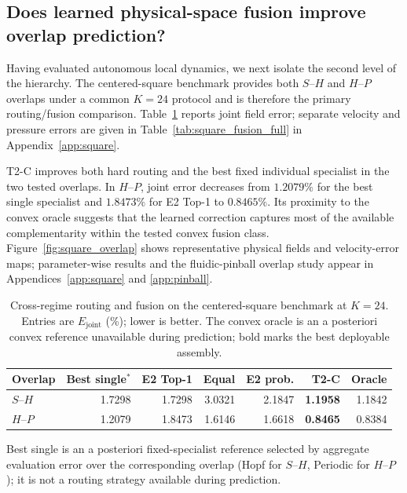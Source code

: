 \subsection{Does learned physical-space fusion improve overlap prediction?}

Having evaluated autonomous local dynamics, we next isolate the second level
of the hierarchy. The centered-square benchmark provides both $S$--$H$ and
$H$--$P$ overlaps under a common $K=24$ protocol and is therefore the primary
routing/fusion comparison. Table~\ref{tab:routing_fusion} reports joint field
error; separate velocity and pressure errors are given in
Table~\ref{tab:square_fusion_full} in Appendix~\ref{app:square}.

T2-C improves both hard routing and the best fixed individual specialist in
the two tested overlaps. In $H$--$P$, joint error decreases from $1.2079\%$
for the best single specialist and $1.8473\%$ for E2 Top-1 to $0.8465\%$.
Its proximity to the convex oracle suggests that the learned correction
captures most of the available complementarity within the tested convex
fusion class. Figure~\ref{fig:square_overlap} shows representative physical
fields and velocity-error maps; parameter-wise results and the fluidic-pinball
overlap study appear in Appendices~\ref{app:square} and \ref{app:pinball}.

\begin{table}[t]
\centering
\caption{Cross-regime routing and fusion on the centered-square benchmark at
$K=24$. Entries are $E_{\mathrm{joint}}$ (\%); lower is better.
The convex oracle is an a posteriori convex reference unavailable during prediction;
bold marks the best deployable assembly.}
\label{tab:routing_fusion}
\small
\setlength{\tabcolsep}{5pt}
\begin{threeparttable}
\begin{tabular}{@{}lrrrrrr@{}}
\toprule
Overlap & Best single$^\ast$ & E2 Top-1 & Equal & E2 prob. & T2-C & Oracle \\
\midrule
$S$--$H$ & 1.7298 & 1.7298 & 3.0321 & 2.1847 & \textbf{1.1958} & 1.1842 \\
$H$--$P$ & 1.2079 & 1.8473 & 1.6146 & 1.6618 & \textbf{0.8465} & 0.8384 \\
\bottomrule
\end{tabular}
\begin{tablenotes}[flushleft]
\footnotesize
\item[$\ast$] Best single is an a posteriori fixed-specialist reference selected
by aggregate evaluation error over the corresponding overlap (Hopf for $S$--$H$,
Periodic for $H$--$P$); it is not a routing strategy available during prediction.
\end{tablenotes}
\end{threeparttable}
\end{table}

